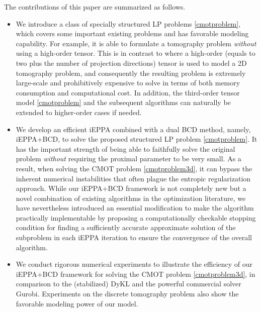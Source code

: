 \documentclass[10pt]{article}
\begin{document}
The contributions of this paper are summarized as follows.

\begin{itemize}[leftmargin=1.05cm]
\item[{\bf 1.}] We introduce a class of specially structured LP problems \eqref{cmotproblem}, which covers some important existing problems and has favorable modeling capability. For example, it is able to formulate a tomography problem \textit{without} using a high-order tensor. This is in contrast to \cite{abraham2017tomographic,bergounioux2018variational} where a high-order (equals to two plus the number of projection directions) tensor is used to model a 2D tomography problem, and consequently the resulting problem is extremely large-scale and  prohibitively expensive to solve in terms of both memory consumption and computational cost. In addition, the third-order tensor model \eqref{cmotproblem} and the subsequent algorithms can naturally be extended to higher-order cases if needed.

\item[{\bf 2.}] We develop an efficient iEPPA combined with a dual BCD method, namely, iEPPA+BCD, to solve the proposed structured LP problem \eqref{cmotproblem}. It has the important strength of being able to faithfully solve the original problem \textit{without} requiring the proximal parameter to be very small. As a result,  when solving the CMOT problem \eqref{cmotproblem3d}, it can bypass the inherent numerical instabilities that often plague the entropic regularization approach. While our iEPPA+BCD framework is not completely new but a novel combination of existing algorithms in the optimization literature, we have nevertheless introduced an essential modification to make the algorithm practically implementable by proposing a computationally checkable stopping condition for finding a sufficiently accurate approximate solution of the subproblem in each iEPPA iteration to ensure the convergence of the overall algorithm.

\item[{\bf 3.}] We conduct rigorous numerical experiments to illustrate the efficiency of our iEPPA+BCD framework for solving the CMOT problem \eqref{cmotproblem3d}, in comparison to the (stabilized) DyKL and the powerful commercial solver Gurobi.
    Experiments on the discrete tomography problem also show the favorable modeling power of our model. %

\end{itemize}
\end{document}
